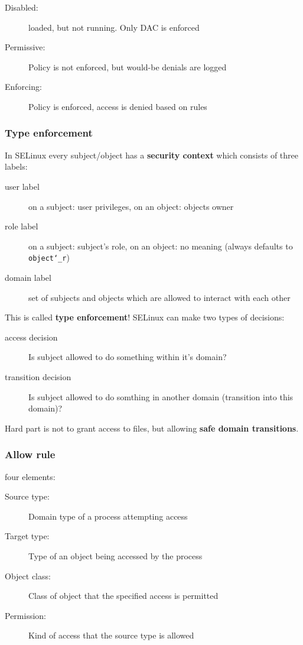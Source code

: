 \begin{description}
  \item[Disabled:] loaded, but not running. Only DAC is enforced
  \item[Permissive:]  Policy is not enforced, but would-be denials are logged
  \item[Enforcing:] Policy is enforced, access is denied based on rules
\end{description}
\subsubsection{Type enforcement}

In SELinux every subject/object has a \textbf{security context} which consists of three labels:\vspace{-1.5mm}
\begin{description}
    \item[user label] on a subject: user privileges, on an object: objects owner
    \item[role label]  on a subject: subject's role, on an object: no meaning (always defaults to \texttt{object\char`_r})
    \item[domain label] set of subjects and objects which are allowed to interact with each other
\end{description}
This is called \textbf{type enforcement}! SELinux can make two types of decisions:\vspace{-1.5mm}
\begin{description}
    \item[access decision] Is subject allowed to do something within it's domain?
    \item[transition decision] Is subject allowed to do somthing in another domain (transition into this domain)?
\end{description}
Hard part is not to grant access to files, but allowing \textbf{safe domain transitions}.

\subsubsection{Allow rule}
four elements:
\begin{description}
  \item[Source type:] Domain type of a process attempting access
  \item[Target type:] Type of an object being accessed by the process
  \item[Object class:] Class of object that the specified access is permitted
  \item[Permission:] Kind of access that the source type is allowed
\end{description}


